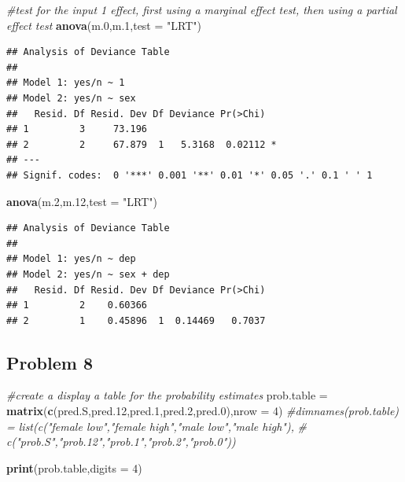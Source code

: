 \documentclass[
  11pt,
]{article}
\newenvironment{Shaded}{\begin{snugshade}}{\end{snugshade}}
\newcommand{\AttributeTok}[1]{\textcolor[rgb]{0.13,0.29,0.53}{#1}}
\newcommand{\CommentTok}[1]{\textcolor[rgb]{0.56,0.35,0.01}{\textit{#1}}}
\newcommand{\DecValTok}[1]{\textcolor[rgb]{0.00,0.00,0.81}{#1}}
\newcommand{\FloatTok}[1]{\textcolor[rgb]{0.00,0.00,0.81}{#1}}
\newcommand{\FunctionTok}[1]{\textcolor[rgb]{0.13,0.29,0.53}{\textbf{#1}}}
\newcommand{\NormalTok}[1]{#1}
\newcommand{\OtherTok}[1]{\textcolor[rgb]{0.56,0.35,0.01}{#1}}
\newcommand{\StringTok}[1]{\textcolor[rgb]{0.31,0.60,0.02}{#1}}
\begin{document}
\begin{Shaded}
\begin{Highlighting}[]
\CommentTok{\#test for the input 1 effect, first using a marginal effect test, then using a partial effect test}
\FunctionTok{anova}\NormalTok{(m}\FloatTok{.0}\NormalTok{,m}\FloatTok{.1}\NormalTok{,}\AttributeTok{test =} \StringTok{"LRT"}\NormalTok{)}
\end{Highlighting}
\end{Shaded}

\begin{verbatim}
## Analysis of Deviance Table
## 
## Model 1: yes/n ~ 1
## Model 2: yes/n ~ sex
##   Resid. Df Resid. Dev Df Deviance Pr(>Chi)  
## 1         3     73.196                       
## 2         2     67.879  1   5.3168  0.02112 *
## ---
## Signif. codes:  0 '***' 0.001 '**' 0.01 '*' 0.05 '.' 0.1 ' ' 1
\end{verbatim}

\begin{Shaded}
\begin{Highlighting}[]
\FunctionTok{anova}\NormalTok{(m}\FloatTok{.2}\NormalTok{,m}\FloatTok{.12}\NormalTok{,}\AttributeTok{test =} \StringTok{"LRT"}\NormalTok{)}
\end{Highlighting}
\end{Shaded}

\begin{verbatim}
## Analysis of Deviance Table
## 
## Model 1: yes/n ~ dep
## Model 2: yes/n ~ sex + dep
##   Resid. Df Resid. Dev Df Deviance Pr(>Chi)
## 1         2    0.60366                     
## 2         1    0.45896  1  0.14469   0.7037
\end{verbatim}

\hypertarget{problem-8}{%
\subsection{Problem 8}\label{problem-8}}


\begin{Shaded}
\begin{Highlighting}[]
\CommentTok{\#create a display a table for the probability estimates}
\NormalTok{prob.table }\OtherTok{=} \FunctionTok{matrix}\NormalTok{(}\FunctionTok{c}\NormalTok{(pred.S,pred}\FloatTok{.12}\NormalTok{,pred}\FloatTok{.1}\NormalTok{,pred}\FloatTok{.2}\NormalTok{,pred}\FloatTok{.0}\NormalTok{),}\AttributeTok{nrow =} \DecValTok{4}\NormalTok{)}
\CommentTok{\#dimnames(prob.table) = list(c("female low","female high","male low","male high"),}
\CommentTok{\#                            c("prob.S","prob.12","prob.1","prob.2","prob.0"))}
                
\FunctionTok{print}\NormalTok{(prob.table,}\AttributeTok{digits =} \DecValTok{4}\NormalTok{)}
\end{Highlighting}
\end{Shaded}
\end{document}
